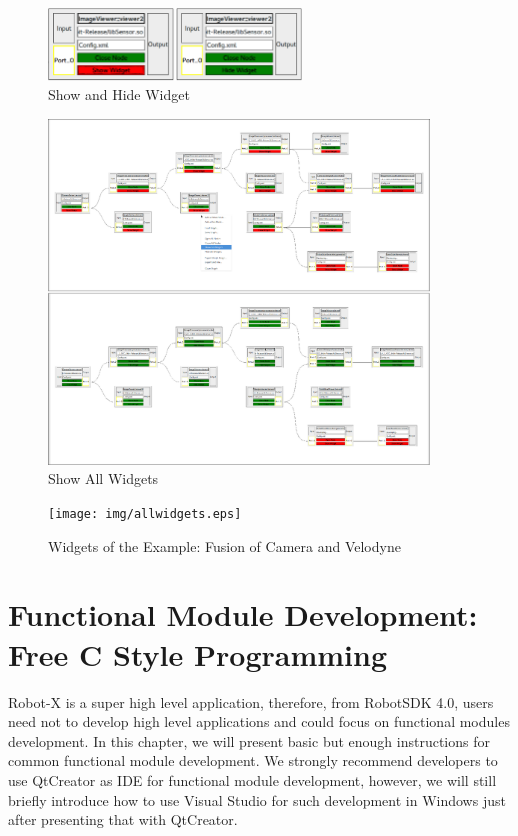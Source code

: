 \documentclass[a4paper,10pt]{book}
\begin{document}
\begin{figure}
 \centering
 \includegraphics[width=0.6\textwidth]{img/showhidewidget.eps}
 \caption{Show and Hide Widget}
 \label{fig:showhidewidget}
\end{figure}

\begin{figure}
 \centering
 \includegraphics[width=0.9\textwidth]{img/showallwidgets.eps}
 \caption{Show All Widgets}
 \label{fig:showallwidgets}
\end{figure}

\begin{figure}
 \centering
 \texttt{[image: img/allwidgets.eps]}
 \caption{Widgets of the Example: Fusion of Camera and Velodyne}
 \label{fig:allwidgets}
\end{figure}

\chapter{Functional Module Development: Free C Style Programming} \label{module}

Robot-X is a super high level application, therefore, from RobotSDK 4.0, users need not to develop high level applications and could focus on functional modules development. In this chapter, we will present basic but enough instructions for common functional module development. We strongly recommend developers to use QtCreator as IDE for functional module development, however, we will still briefly introduce how to use Visual Studio for such development in Windows just after presenting that with QtCreator.
\end{document}
